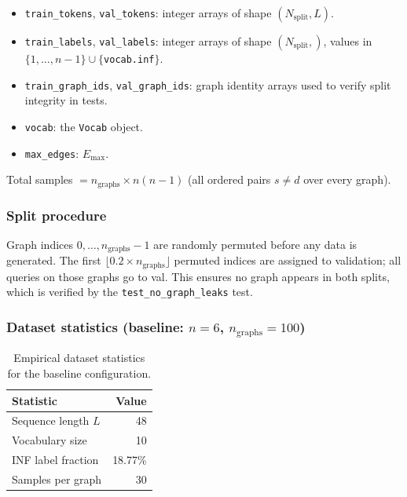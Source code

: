 \documentclass[11pt, a4paper]{article}
\begin{document}
\begin{itemize}[noitemsep]
  \item \texttt{train\_tokens}, \texttt{val\_tokens}: integer arrays of shape
        $(N_{\text{split}}, L)$.
  \item \texttt{train\_labels}, \texttt{val\_labels}: integer arrays of shape
        $(N_{\text{split}},)$, values in
        $\{1, \ldots, n-1\} \cup \{$\texttt{vocab.inf}$\}$.
  \item \texttt{train\_graph\_ids}, \texttt{val\_graph\_ids}: graph identity
        arrays used to verify split integrity in tests.
  \item \texttt{vocab}: the \texttt{Vocab} object.
  \item \texttt{max\_edges}: $E_{\max}$.
\end{itemize}

Total samples $= n_{\text{graphs}} \times n(n-1)$ (all ordered pairs
$s \neq d$ over every graph).

\subsubsection{Split procedure}

Graph indices $0, \ldots, n_{\text{graphs}}-1$ are randomly permuted before
any data is generated. The first $\lfloor 0.2 \times n_{\text{graphs}} \rfloor$
permuted indices are assigned to validation; all queries on those graphs go to
val. This ensures no graph appears in both splits, which is verified by the
\texttt{test\_no\_graph\_leaks} test.

\subsubsection{Dataset statistics (baseline: $n=6$, $n_{\text{graphs}}=100$)}

\begin{table}[H]
\centering
\begin{tabular}{@{}lr@{}}
\toprule
Statistic & Value \\
\midrule
Sequence length $L$           & 48 \\
Vocabulary size               & 10 \\
INF label fraction            & 18.77\% \\
Samples per graph             & 30 \\
\bottomrule
\end{tabular}
\caption{Empirical dataset statistics for the baseline configuration.}
\end{table}
\end{document}
